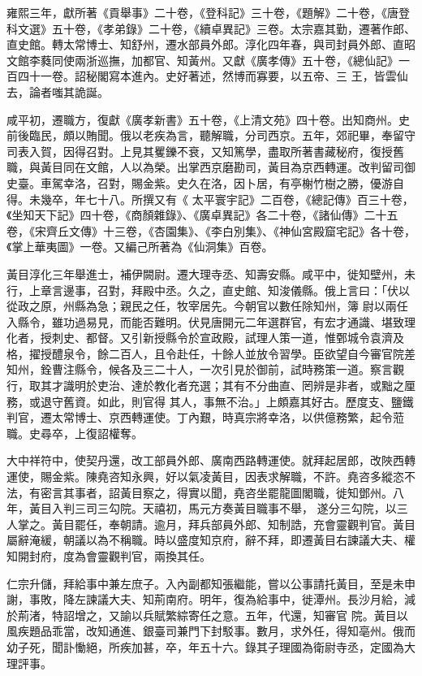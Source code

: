 \begin{pinyinscope}
 雍熙三年，獻所著《貢舉事》二十卷，《登科記》三十卷，《題解》二十卷，《唐登科文選》五十卷，《孝弟錄》二十卷，《續卓異記》三卷。太宗嘉其勤，遷著作郎、直史館。轉太常博士、知舒州，遷水部員外郎。淳化四年春，與司封員外郎、直昭文館李蕤同使兩浙巡撫，加都官、知黃州。又獻《廣孝傳》五十卷，《總仙記》一百四十一卷。詔秘閣寫本進內。史好著述，然博而寡要，以五帝、三
 王，皆雲仙去，論者嗤其詭誕。



 咸平初，遷職方，復獻《廣孝新書》五十卷，《上清文苑》四十卷。出知商州。史前後臨民，頗以賄聞。俄以老疾為言，聽解職，分司西京。五年，郊祀畢，奉留守司表入賀，因得召對。上見其矍鑠不衰，又知篤學，盡取所著書藏秘府，復授舊職，與黃目同在文館，人以為榮。出掌西京磨勘司，黃目為京西轉運。改判留司御史臺。車駕幸洛，召對，賜金紫。史久在洛，因卜居，有亭榭竹樹之勝，優游自得。未幾卒，年七十八。所撰又有《
 太平寰宇記》二百卷，《總記傳》百三十卷，《坐知天下記》四十卷，《商顏雜錄》、《廣卓異記》各二十卷，《諸仙傳》二十五卷，《宋齊丘文傳》十三卷，《杏園集》、《李白別集》、《神仙宮殿窟宅記》各十卷，《掌上華夷圖》一卷。又編己所著為《仙洞集》百卷。



 黃目淳化三年舉進士，補伊闕尉。遷大理寺丞、知壽安縣。咸平中，徙知壁州，未行，上章言邊事，召對，拜殿中丞。久之，直史館、知浚儀縣。俄上言曰：「伏以從政之原，州縣為急；親民之任，牧宰居先。今朝官以數任除知州，簿
 尉以兩任入縣令，雖功過易見，而能否難明。伏見唐開元二年選群官，有宏才通識、堪致理化者，授刺史、都督。又引新授縣令於宣政殿，試理人策一道，惟鄄城令袁濟及格，擢授醴泉令，餘二百人，且令赴任，十餘人並放令習學。臣欲望自今審官院差知州，銓曹注縣令，候各及三二十人，一次引見於御前，試時務策一道。察言觀行，取其才識明於吏治、達於教化者充選；其有不分曲直、罔辨是非者，或黜之厘務，或退守舊資。如此，則官得
 其人，事無不治。」上頗嘉其好古。歷度支、鹽鐵判官，遷太常博士、京西轉運使。丁內艱，時真宗將幸洛，以供億務繁，起令蒞職。史尋卒，上復詔權奪。



 大中祥符中，使契丹還，改工部員外郎、廣南西路轉運使。就拜起居郎，改陜西轉運使，賜金紫。陳堯咨知永興，好以氣凌黃目，因表求解職，不許。堯咨多縱恣不法，有密言其事者，詔黃目察之，得實以聞，堯咨坐罷龍圖閣職，徙知鄧州。八年，黃目入判三司三勾院。天禧初，馬元方奏黃目職事不舉，
 遂分三勾院，以三人掌之。黃目罷任，奉朝請。逾月，拜兵部員外郎、知制誥，充會靈觀判官。黃目屬辭淹緩，朝議以為不稱職。時以盛度知京府，辭不拜，即遷黃目右諫議大夫、權知開封府，度為會靈觀判官，兩換其任。



 仁宗升儲，拜給事中兼左庶子。入內副都知張繼能，嘗以公事請托黃目，至是未申謝，事敗，降左諫議大夫、知荊南府。明年，復為給事中，徙潭州。長沙月給，減於荊渚，特詔增之，又諭以兵賦繁綜寄任之意。五年，代還，知審官
 院。黃目以風疾題品乖當，改知通進、銀臺司兼門下封駁事。數月，求外任，得知亳州。俄而幼子死，聞訃慟絕，所疾加甚，卒，年五十六。錄其子理國為衛尉寺丞，定國為大理評事。




\end{pinyinscope}
